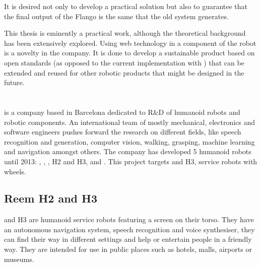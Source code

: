 It is desired not only to develop a practical solution but also to guarantee that the final output of the Flango \cm is the same that the old system generates.

This thesis is eminently a practical work, although the theoretical background has been extensively explored. 
Using web technology in a component of the robot is a novelty in the company. 
It is done to develop a sustainable product based on open standards (as opposed to the current implementation with \flash) that can be extended and reused for other robotic products that might be designed in the future.

\section{\company}
\company is a company based in Barcelona dedicated to R\&D of humanoid robots and robotic components. 
An international team of mostly mechanical, electronics and software engineers pushes forward the research on different fields, like speech recognition and generation, computer vision, walking, grasping, machine learning and navigation amongst others.
The company has developed 5 humanoid robots until 2013: , , , H2 and H3, and .
This project targets  and H3, service robots with wheels.

\subsection{Reem H2 and H3}
  and H3  are humanoid service robots featuring a screen on their torso.
They have an autonomous navigation system, speech recognition and voice synthesiser, they can find their way in different settings and help or entertain people in a friendly way.
They are intended for use in public places such as hotels, malls, airports or museums.

